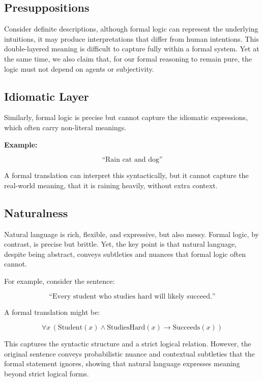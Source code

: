\documentclass[12pt,a4paper,openany]{article}
\begin{document}
\subsection{Presuppositions}\label{presuppositions}

Consider definite descriptions, although formal logic can represent the
underlying intuitions, it may produce interpretations that differ from
human intentions. This double-layered meaning is difficult to capture
fully within a formal system. Yet at the same time, we also claim that,
for our formal reasoning to remain pure, the logic must not depend on
agents or subjectivity.

\subsection{Idiomatic Layer}\label{idiomatic-layer}

Similarly, formal logic is precise but cannot capture the idiomatic
expressions, which often carry non-literal meanings.

\textbf{Example:}

\[\text{“Rain cat and dog”}\]

A formal translation can interpret this syntactically, but it cannot
capture the real-world meaning, that it is raining heavily, without
extra context.

\subsection{Naturalness}\label{naturalness}

Natural language is rich, flexible, and expressive, but also messy.
Formal logic, by contrast, is precise but brittle. Yet, the key point is
that natural language, despite being abstract, conveys subtleties and
nuances that formal logic often cannot.

For example, consider the sentence:

\[\text{“Every student who studies hard will likely succeed.”}\]

A formal translation might be:

\[
\forall x \, (\text{Student}(x) \wedge \text{StudiesHard}(x) \rightarrow \text{Succeeds}(x))
\]

This captures the syntactic structure and a strict logical relation.
However, the original sentence conveys probabilistic nuance and
contextual subtleties that the formal statement ignores, showing that
natural language expresses meaning beyond strict logical forms.
\end{document}

